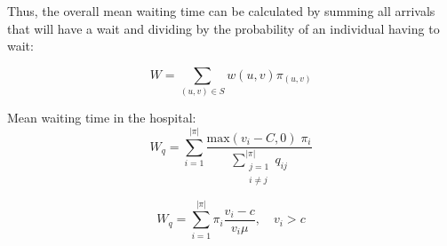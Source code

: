 
Thus, the overall mean waiting time can be calculated by summing all arrivals that will have a wait and dividing by the probability of an individual having to wait:

\begin{equation}
    W = \sum_{(u,v) \in S} w(u,v) \pi_{(u,v)}
\end{equation}















\newpage
Mean waiting time in the hospital:
\begin{equation}
    W_q = \sum_{i=1}^{|\pi|} \frac{\text{max}(v_i - C, 0) \; \pi_i}{\sum_{\substack{j=1 \\ i \neq j}}^{|\pi|} q_{i j}}
\end{equation}

\begin{equation}
    W_q = \sum_{i=1}^{|\pi|} \pi_i \frac{v_i - c}{v_i \mu}, \quad v_i > c
\end{equation}
